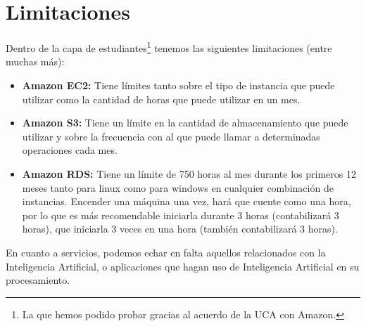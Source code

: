 \section{Limitaciones}
Dentro de la capa de estudiantes\footnote{La que hemos podido probar gracias al acuerdo de la UCA con Amazon.} tenemos las siguientes limitaciones (entre muchas más):
\begin{itemize}
	\item \textbf{Amazon EC2:} Tiene límites tanto sobre el tipo de instancia que puede utilizar como la cantidad de horas que puede utilizar en un mes.
	\item \textbf{Amazon S3:} Tiene un límite en la cantidad de almacenamiento que puede utilizar y sobre la frecuencia con al que puede llamar a determinadas operaciones cada mes.
	\item \textbf{Amazon RDS:} Tiene un límite de 750 horas al mes durante los primeros 12 meses tanto para linux como para windows en cualquier combinación de instancias. Encender una máquina una vez, hará que cuente como una hora, por lo que es más recomendable iniciarla durante 3 horas (contabilizará 3 horas), que iniciarla 3 veces en una hora (también contabilizará 3 horas).
\end{itemize}

En cuanto a servicios, podemos echar en falta aquellos relacionados con la Inteligencia Artificial, o aplicaciones que hagan uso de Inteligencia Artificial en su procesamiento.